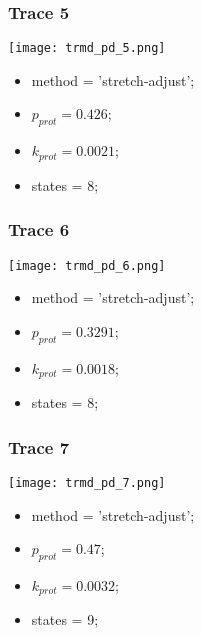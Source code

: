 \subsubsection{Trace 5}
\begin{minipage}[c]{0.7\textwidth}
	\texttt{[image: trmd\_pd\_5.png]}
\end{minipage}
\hfill
\begin{minipage}[c]{0.45\textwidth}
	\begin{itemize}
		\item method = 'stretch-adjust';
		\item $p_{prot}=0.426$;
		\item $k_{prot}=0.0021$;
		\item states = 8;
	\end{itemize}
\end{minipage}

\subsubsection{Trace 6}
\begin{minipage}[c]{0.7\textwidth}
	\texttt{[image: trmd\_pd\_6.png]}
\end{minipage}
\hfill
\begin{minipage}[c]{0.45\textwidth}
	\begin{itemize}
		\item method = 'stretch-adjust';
		\item $p_{prot}=0.3291$;
		\item $k_{prot}=0.0018$;
		\item states = 8;
	\end{itemize}
\end{minipage}

\subsubsection{Trace 7}
\begin{minipage}[c]{0.7\textwidth}
	\texttt{[image: trmd\_pd\_7.png]}
\end{minipage}
\hfill
\begin{minipage}[c]{0.45\textwidth}
	\begin{itemize}
		\item method = 'stretch-adjust';
		\item $p_{prot}=0.47$;
		\item $k_{prot}=0.0032$;
		\item states = 9;
	\end{itemize}
\end{minipage}

